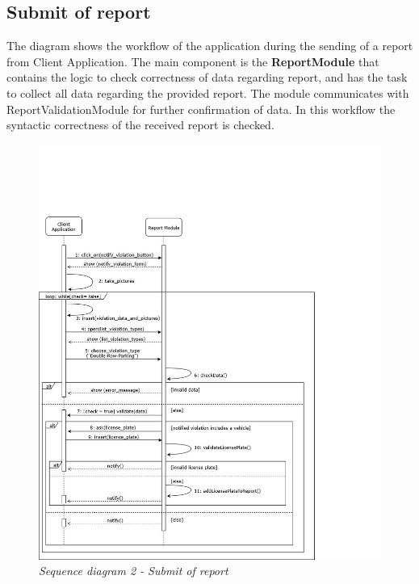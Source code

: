 \subsection{Submit of report}
The diagram shows the workflow of the application during the sending of a report from Client Application. The main 
component is the \textbf{ReportModule} that contains the logic to check correctness of data regarding report, and has the task to collect all
data regarding the provided report. The module communicates with ReportValidationModule for further confirmation of data. In this workflow 
the syntactic correctness of the received report is checked.  

\begin{figure}[H]
  \centering
  \includegraphics[width=\textwidth]{DD_Images/RunTimeView/2.jpg}
  \caption{\textit{Sequence diagram 2 - Submit of report}}
\end{figure}

